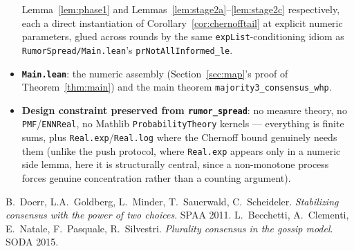 \documentclass[11pt]{article}
\begin{document}
\begin{itemize}[leftmargin=2em]
  Lemma~\ref{lem:phase1} and Lemmas~\ref{lem:stage2a}--\ref{lem:stage2c}
  respectively, each a direct instantiation of
  Corollary~\ref{cor:chernofftail} at explicit numeric parameters, glued
  across rounds by the same \texttt{expList}-conditioning idiom as
  \texttt{RumorSpread/Main.lean}'s \texttt{prNotAllInformed\_le}.
\item \textbf{\texttt{Main.lean}}: the numeric assembly
  (Section~\ref{sec:map}'s proof of Theorem~\ref{thm:main}) and the main
  theorem \texttt{majority3\_consensus\_whp}.
\item \textbf{Design constraint preserved from \texttt{rumor\_spread}}: no
  measure theory, no \texttt{PMF}/\texttt{ENNReal}, no Mathlib
  \texttt{ProbabilityTheory} kernels — everything is finite sums, plus
  \texttt{Real.exp}/\texttt{Real.log} where the Chernoff bound genuinely
  needs them (unlike the push protocol, where \texttt{Real.exp} appears
  only in a numeric side lemma, here it is structurally central, since a
  non-monotone process forces genuine concentration rather than a counting
  argument).
\end{itemize}

\begin{thebibliography}{9}
 B.~Doerr, L.A.~Goldberg, L.~Minder, T.~Sauerwald,
C.~Scheideler. \emph{Stabilizing consensus with the power of two choices}.
SPAA 2011.
 L.~Becchetti, A.~Clementi, E.~Natale, F.~Pasquale,
R.~Silvestri. \emph{Plurality consensus in the gossip model}. SODA 2015.
\end{thebibliography}
\end{document}

